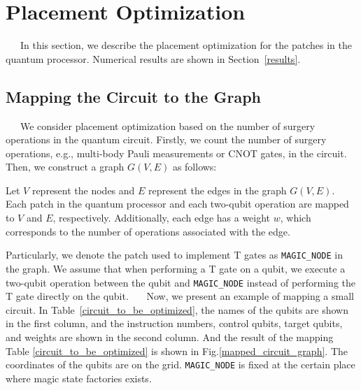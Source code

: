 \documentclass[a4paper,11pt]{ltjsarticle}
\begin{document}
\section{Placement Optimization}\label{placement_optimization}{
    \ \ \ In this section, we describe the placement optimization for the patches in the quantum processor. Numerical results are shown in Section~\ref{results}.

    \subsection{Mapping the Circuit to the Graph}{
        \ \ \ We consider placement optimization based on the number of surgery operations in the quantum circuit. Firstly, we count the number of surgery operations, e.g., multi-body Pauli measurements or CNOT gates, in the circuit. Then, we construct a graph $G(V, E)$ as follows:

        \begin{definition}
            Let $V$ represent the nodes and $E$ represent the edges in the graph $G(V, E)$. Each patch in the quantum processor and each two-qubit operation are mapped to $V$ and $E$, respectively. Additionally, each edge has a weight $w$, which corresponds to the number of operations associated with the edge.
        \end{definition}

        Particularly, we denote the patch used to implement T gates as \texttt{MAGIC\_NODE} in the graph. We assume that when performing a T gate on a qubit, we execute a two-qubit operation between the qubit and \texttt{MAGIC\_NODE} instead of performing the T gate directly on the qubit.
        \ \ \ Now, we present an example of mapping a small circuit. In Table~\ref{circuit_to_be_optimized}, the names of the qubits are shown in the first column, and the instruction numbers, control qubits, target qubits, and weights are shown in the second column. And the result of the mapping Table \ref{circuit_to_be_optimized} is shown in Fig.\ref{mapped_circuit_graph}. The coordinates of the qubits are on the grid. \texttt{MAGIC\_NODE} is fixed at the certain place where magic state factories exists.

}}
\end{document}
